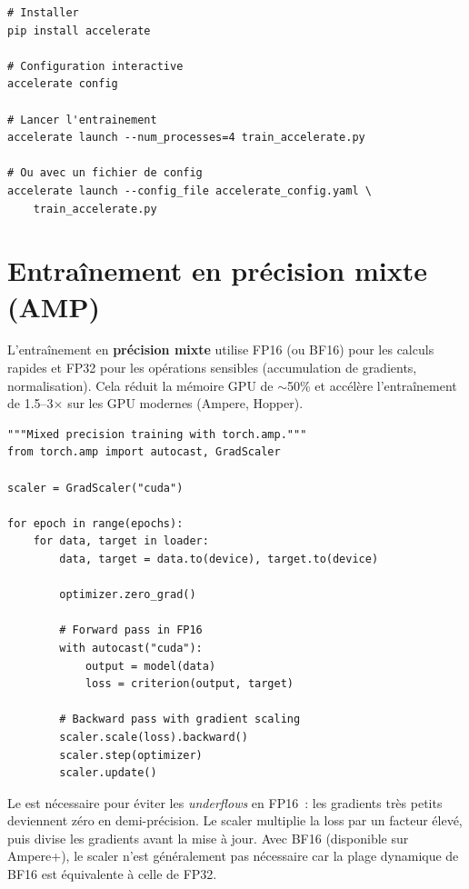 \begin{codeblock}[title=\textbf{Configuration et lancement Accelerate}]
\begin{verbatim}
# Installer
pip install accelerate

# Configuration interactive
accelerate config

# Lancer l'entrainement
accelerate launch --num_processes=4 train_accelerate.py

# Ou avec un fichier de config
accelerate launch --config_file accelerate_config.yaml \
    train_accelerate.py
\end{verbatim}
\end{codeblock}

\section{Entra\^inement en pr\'ecision mixte (AMP)}
\label{sec:mixed-precision}

L'entra\^inement en \textbf{pr\'ecision mixte}
utilise FP16 (ou BF16) pour les calculs rapides et FP32 pour les
op\'erations sensibles (accumulation de gradients, normalisation). Cela
r\'eduit la m\'emoire GPU de $\sim$50\% et acc\'el\`ere l'entra\^inement
de 1.5--3$\times$ sur les GPU modernes (Ampere, Hopper).

\begin{codeblock}[title=\textbf{AMP avec PyTorch natif}]
\begin{verbatim}
"""Mixed precision training with torch.amp."""
from torch.amp import autocast, GradScaler

scaler = GradScaler("cuda")

for epoch in range(epochs):
    for data, target in loader:
        data, target = data.to(device), target.to(device)

        optimizer.zero_grad()

        # Forward pass in FP16
        with autocast("cuda"):
            output = model(data)
            loss = criterion(output, target)

        # Backward pass with gradient scaling
        scaler.scale(loss).backward()
        scaler.step(optimizer)
        scaler.update()
\end{verbatim}
\end{codeblock}

\begin{remarque}
Le  est n\'ecessaire pour \'eviter les \emph{underflows}
en FP16~: les gradients tr\`es petits deviennent z\'ero en demi-pr\'ecision.
Le scaler multiplie la loss par un facteur \'elev\'e, puis divise les
gradients avant la mise \`a jour. Avec BF16 (disponible sur Ampere+), le
scaler n'est g\'en\'eralement pas n\'ecessaire car la plage dynamique de
BF16 est \'equivalente \`a celle de FP32.
\end{remarque}

